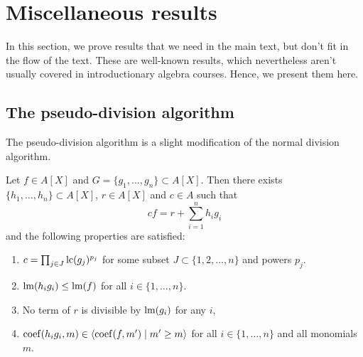 \section{Miscellaneous results}
In this section, we prove results that we need in the main text, but don't fit in the flow of the text. These are well-known results, which nevertheless aren't usually covered in introductionary algebra courses. Hence, we present them here.

\subsection{The pseudo-division algorithm}\label{app:pseudo}
The pseudo-division algorithm is a slight modification of the normal division algorithm.

\begin{theorem}
  Let $f \in A[X]$ and $G = \{g_{1}, \dots, g_{n}\} \subset A[X]$. Then there exists $\{h_{1}, \dots, h_{n}\} \subset A[X]$, $r \in A[X]$ and $c \in A$ such that
  \[c f = r + \sum_{i=1}^{n} h_{i} g_{i}\]
  and the following properties are satisfied:
  \begin{enumerate}
          \item $c = \prod_{j \in J} \operatorname{lc}(g_{j})^{p_{j}}$ for some subset $J \subset \{1, 2, \dots, n\}$ and powers $p_{j}$.
    \item $\operatorname{lm}(h_{i} g_{i}) \leq \operatorname{lm}(f)$ for all $i \in \{1, \dots, n\}$.
    \item No term of $r$ is divisible by $\operatorname{lm}(g_{i})$ for any $i$,
    \item $\operatorname{coef}(h_{i} g_{i}, m) \in \langle \operatorname{coef}(f, m') \mid m' \geq m \rangle$ for all $i \in \{1, \dots, n\}$ and all monomials $m$.
  \end{enumerate}
\end{theorem}
